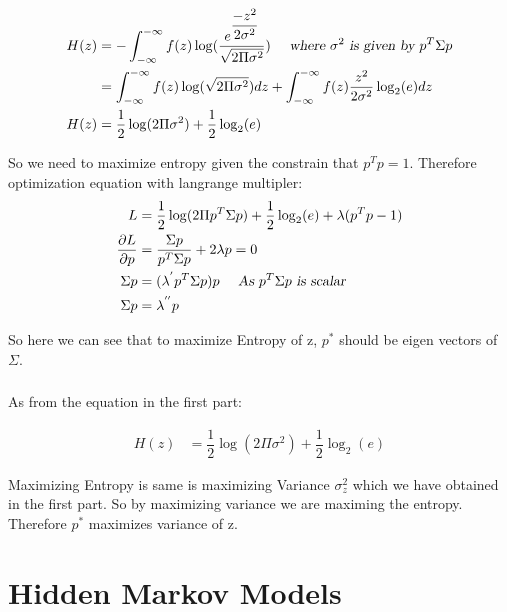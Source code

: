 \documentclass[paper=a4, fontsize=11pt]{scrartcl} %
\numberwithin{equation}{section} %
\numberwithin{figure}{section} %
\numberwithin{table}{section} %
\begin{document}
\begin{align*} 
H(z) &= -\int_{-\infty}^{-\infty}f(z)\log(\dfrac{e^{\dfrac{-z^{2}}{2\sigma^{2}}}}{\sqrt{2\Pi \sigma^{2}}}) ~~~~ \textsl{where $\sigma^{2}$ is given by $p^{T}\Sigma p$}\\
&= \int_{-\infty}^{-\infty}f(z)\log(\sqrt{2\Pi \sigma^{2}})dz + \int_{-\infty}^{-\infty}f(z)\dfrac{z^{2}}{2\sigma^{2}}\log_{2}(e) dz\\
H(z) &= \dfrac{1}{2}\log(2\Pi \sigma^{2}) + \dfrac{1}{2}\log_{2}(e)
\end{align*}

So we need to maximize entropy given the constrain that $p^{T}p=1$. Therefore optimization equation with langrange multipler:
\begin{align*} 
L &= \dfrac{1}{2}\log(2\Pi p^{T}\Sigma p) + \dfrac{1}{2}\log_{2}(e) + \lambda (p^{T}p-1)\\
\dfrac{\partial L}{\partial p} &= \dfrac{\Sigma p}{p^{T}\Sigma p} + 2\lambda p = 0\\
\Sigma p &= (\lambda^{'}p^{T}\Sigma p)p  ~~~~ \textsl{As $p^{T}\Sigma p$ is scalar}\\
\Sigma p &= \lambda^{''}p
\end{align*}

So here we can see that to maximize Entropy of z, $p^{*}$ should be eigen vectors of $\Sigma$.

\subsubsection{}
As from the equation in the first part:

\begin{align*} 
H(z) &= \dfrac{1}{2}\log(2\Pi \sigma^{2}) + \dfrac{1}{2}\log_{2}(e)
\end{align*}

Maximizing Entropy is same is maximizing Variance $\sigma^{2}_{z}$ which we have obtained in the first part. So by maximizing variance we are maximing the entropy. Therefore $p^{*}$ maximizes variance of z.




\section{Hidden Markov Models}
\end{document}
